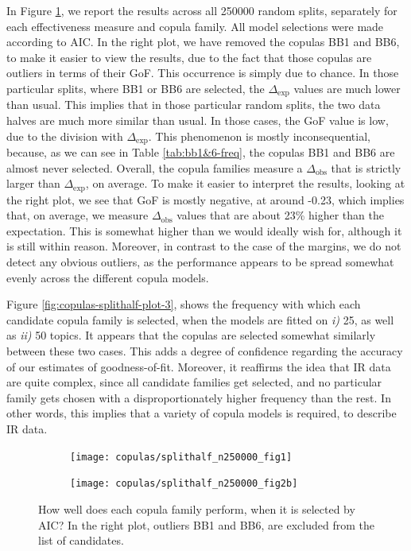 In Figure \ref{fig:copulas-splithalf-plot-1&2b}, we report the results across all \num{250000} random splits, separately for each effectiveness measure and copula family. All model selections were made according to AIC. In the right plot, we have removed the copulas BB1 and BB6, to make it easier to view the results, due to the fact that those copulas are outliers in terms of their GoF. This occurrence is simply due to chance. In those particular splits, where BB1 or BB6 are selected, the $\Delta_{\text{exp}}$ values are much lower than usual. This implies that in those particular random splits, the two data halves are much more similar than usual. In those cases, the GoF value is low, due to the division with $\Delta_{\text{exp}}$. This phenomenon is mostly inconsequential, because, as we can see in Table \ref{tab:bb1&6-freq}, the copulas BB1 and BB6 are almost never selected. Overall, the copula families measure a $\Delta_{\text{obs}}$ that is strictly larger than $\Delta_{\text{exp}}$, on average. To make it easier to interpret the results, looking at the right plot, we see that GoF is mostly negative, at around -0.23, which implies that, on average, we measure $\Delta_{\text{obs}}$ values that are about 23\% higher than the expectation. This is somewhat higher than we would ideally wish for, although it is still within reason. Moreover, in contrast to the case of the margins, we do not detect any obvious outliers, as the performance appears to be spread somewhat evenly across the different copula models.

Figure \ref{fig:copulas-splithalf-plot-3}, shows the frequency with which each candidate copula family is selected, when the models are fitted on \textit{i)} 25, as well as \textit{ii)} 50 topics. It appears that the copulas are selected somewhat similarly between these two cases. This adds a degree of confidence regarding the accuracy of our estimates of goodness-of-fit. Moreover, it reaffirms the idea that IR data are quite complex, since all candidate families get selected, and no particular family gets chosen with a disproportionately higher frequency than the rest. In other words, this implies that a variety of copula models is required, to describe IR data.

\begin{figure}[!t]
	\centering	
	\begin{subfigure}[t]{.42\textwidth}
		\centering
		\texttt{[image: copulas/splithalf\_n250000\_fig1]}
	\end{subfigure}%
	\begin{subfigure}[t]{.42\textwidth}
		\centering
		\texttt{[image: copulas/splithalf\_n250000\_fig2b]}
	\end{subfigure}
	\caption{How well does each copula family perform, when it is selected by AIC? In the right plot, outliers BB1 and BB6, are excluded from the list of candidates.}
	\label{fig:copulas-splithalf-plot-1&2b}
\end{figure}


